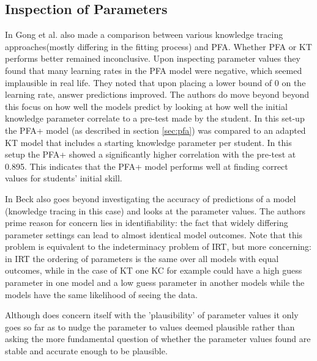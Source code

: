 \documentclass{scrartcl}
\begin{document}
\subsection{Inspection of Parameters}
In \cite{ktpfa} Gong et al. also made a comparison between various knowledge tracing approaches(mostly differing in the fitting process) and PFA. Whether PFA or KT performs better remained inconclusive. Upon inspecting parameter values they found that many learning rates in the PFA model were negative, which seemed implausible in real life. They noted that upon placing a lower bound of 0 on the learning rate, answer predictions improved. The authors do move beyond beyond this focus on how well the models predict by looking at how well the initial knowledge parameter correlate to a pre-test made by the student. In this set-up the PFA+ model (as described in section \ref{sec:pfa}) was compared to an adapted KT model that includes a starting knowledge parameter per student. In this setup the PFA+ showed a significantly higher correlation with the pre-test at 0.895. This indicates that the PFA+ model performs well at finding correct values for students' initial skill.

In \cite{knowledgeproblem} Beck also goes beyond investigating the accuracy of predictions of a model (knowledge tracing in this case) and looks at the parameter values. The authors prime reason for concern lies in identifiability: the fact that widely differing parameter settings can lead to almost identical model outcomes. Note that this problem is equivalent to the indeterminacy problem of IRT, but more concerning: in IRT the ordering of parameters is the same over all models with equal outcomes, while in the case of KT one KC for example could have a high guess parameter in one model and a low guess parameter in another models while the models have the same likelihood of seeing the data. 

Although \cite{knowledgeproblem} does concern itself with the 'plausibility' of parameter values it only goes so far as to nudge the parameter to values deemed plausible rather than asking the more fundamental question of whether the parameter values found are stable and accurate enough to be plausible.
\end{document}
